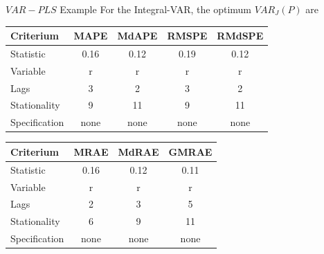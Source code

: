 \documentclass{beamer}
\newcommand{\?}{?`}
\begin{document}
\begin{frame}{$VAR-PLS$ Example}
  For the Integral-VAR, the optimum $VAR_J(P)$ are

    \medskip

  \begin{footnotesize}
  \begin{tabular}{|l|c|c|c|c|}
    \hline
    Criterium & MAPE & MdAPE & RMSPE & RMdSPE \\
    \hline
   Statistic & 0.16 & 0.12 & 0.19 & 0.12 \\
    Variable & r & r & r & r \\
    Lags & 3 & 2 & 3 & 2 \\
    Stationality & 9 & 11 & 9 & 11 \\
    Specification & none & none & none & none \\
    \hline
  \end{tabular}
  \end{footnotesize}

  \begin{footnotesize}
  \begin{tabular}{|l|c|c|c|}
    \hline
    Criterium & MRAE & MdRAE & GMRAE \\
    \hline
    Statistic & 0.16 & 0.12 & 0.11 \\
    Variable & r & r & r \\
    Lags & 2 & 3 & 5 \\
    Stationality & 6 & 9 & 11 \\
    Specification & none& none& none \\
    \hline
  \end{tabular}
  \end{footnotesize}
  \medskip
\end{frame}
\end{document}
